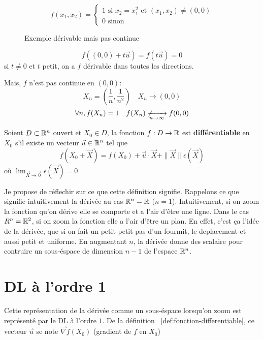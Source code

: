 \begin{eg}
   \[
   f(x_1, x_2) = \begin{cases}
       1  \text{ si } x_2 = x_1^2 \text{ et } (x_1, x_2) \neq (0, 0)\\
       0 \text{ sinon}
   \end{cases}
   \]  
\begin{figure}[H]
    \centering
    \caption{Exemple dérivable mais pas continue}
    \label{fig:exemple-dervie-partielle}
\end{figure}
\[
    f((0, 0) + t \vec{u}) = f(t \vec{u}) = 0
\] 
si $t\neq 0$ et $t$ petit, on a $f$ dérivable dans toutes les directions.
\par
Mais, $f$ n'est pas continue en  $(0, 0)$:
 \[
X_n = (\frac{1}{n}, \frac{1}{n^2}) \quad X_n \to (0, 0)
\] 
\[
\forall n, f(X_n) = 1 \quad f(X_n) \not\xrightarrow[n \to \infty]{} f(0, 0)
\] 
\end{eg}

\begin{definition}\label{def:fonction-differentiable}
    Soient $D \subset \mathbb{R}^n$ ouvert et $X_0 \in D$, la fonction
    $f: D \to \mathbb{R}$
    est \textbf{différentiable} en $X_0$ s'il existe un vecteur $\vec{u} \in \mathbb{R}^n$ tel que 
    \[
        f(X_0 + \vec{X}) = f(X_0) + \vec{u} \cdot \vec{X} + \|\vec{X}\|\epsilon(\vec{X})
    \] 
    où $\lim_{\vec{X} \to \vec{0}} \epsilon(\vec{X}) = 0$
\end{definition}
\begin{intuition}
   Je propose de réflechir sur ce que cette définition signifie. 
   Rappelons ce que signifie intuitivement la dérivée au cas $\mathbb{R}^n = \mathbb{R}$ ($n = 1$). 
   Intuitivement, si on zoom la fonction qu'on dérive elle se comporte et a l'air d'être une ligne. 
   Dans le cas $R^n = \mathbb{R}^2$, si on zoom la fonction elle a l'air d'être un plan. 
   En effet, c'est ça l'idée de la dérivée, que si on fait un petit petit pas d'un fourmit, le deplacement et aussi petit et uniforme. 
   En augmentant $n$, la dérivée donne des scalaire pour contruire un sous-éspace de dimension $n-1$ de l'espace $\mathbb{R}^n$. 
\end{intuition}

\section{DL à l'ordre 1}
Cette représentation de la dérivée comme un sous-éspace lorsqu'on zoom est représenté par le DL à l'ordre $1$.
De la définition ~\ref{def:fonction-differentiable}, ce vecteur $\vec{u}$ se note $\vec{\nabla}f(X_0)$ (gradient de $f$ en  $X_0$)

